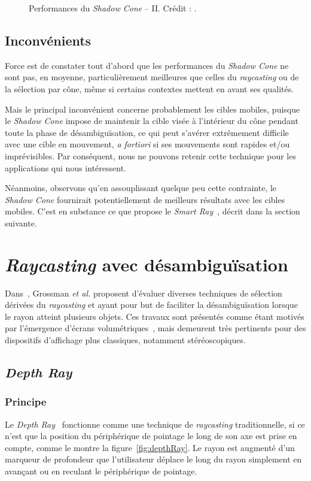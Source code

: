 \begin{figure}[!htb]
\begin{subfigure}[t]{0.49\textwidth}
			\label{fig:shadowCSmall}
		\end{subfigure}
		\caption[Performances du \emph{Shadow Cone} -- II]{Performances du \emph{Shadow Cone} -- II. Crédit : \cite{steed20043d}.}
		\label{fig:shadowConePerf3}
	\end{figure}
	
	\subsection{Inconvénients}
	Force est de constater tout d'abord que les performances du \emph{Shadow Cone} ne sont pas, en moyenne, particulièrement meilleures que celles du \emph{raycasting} ou de la sélection par cône, même si certains contextes mettent en avant ses qualités.
	
	Mais le principal inconvénient concerne probablement les cibles mobiles, puisque le \emph{Shadow Cone} impose de maintenir la cible visée à l'intérieur du cône pendant toute la phase de désambiguïsation, ce qui peut s'avérer extrêmement difficile avec une cible en mouvement, \emph{a fortiori} si ses mouvements sont rapides et/ou imprévisibles. Par conséquent, nous ne pouvons retenir cette technique pour les applications qui nous intéressent.
	
	Néanmoins, observons qu'en assouplissant quelque peu cette contrainte, le \emph{Shadow Cone} fournirait potentiellement de meilleurs résultats avec les cibles mobiles. C'est en substance ce que propose le \emph{Smart Ray}~\cite{grossman2006design}, décrit dans la section suivante.	
	
\section{\emph{Raycasting} avec désambiguïsation}
	Dans~\cite{grossman2006design}, Grossman \emph{et al.} proposent d'évaluer diverses techniques de sélection dérivées du \emph{raycasting} et ayant pour but de faciliter la désambiguïsation lorsque le rayon atteint plusieurs objets. Ces travaux sont présentés comme étant motivés par l'émergence d'écrans volumétriques~\cite{ebert1999realizing}, mais demeurent très pertinents pour des dispositifs d'affichage plus classiques, notamment stéréoscopiques.

	\subsection{\emph{Depth Ray}}
	\subsubsection{Principe}
	Le \emph{Depth Ray}~\cite{grossman2006design} fonctionne comme une technique de \emph{raycasting} traditionnelle, si ce n'est que la position du périphérique de pointage le long de son axe est prise en compte, comme le montre la figure~\ref{fig:depthRay}. Le rayon est augmenté d'un marqueur de profondeur que l'utilisateur déplace le long du rayon simplement en avançant ou en reculant le périphérique de pointage.
	
